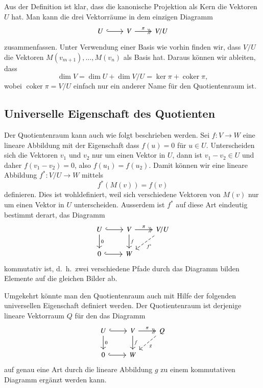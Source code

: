 Aus der Definition ist klar, dass die kanonische Projektion als
Kern die Vektoren $U$ hat.
Man kann die drei Vektorräume in dem einzigen Diagramm
\[
\begin{tikzcd}
U\ar[r,hook] & V \ar[r,two heads,"\pi"] & V/U
\end{tikzcd}
\]
zusammenfassen.
Unter Verwendung einer Basis wie vorhin finden wir, dass $V/U$ die
Vektoren $M(v_{m+1}),\dots,M(v_n)$ als Basis hat.
Daraus können wir ableiten, dass
\[
\operatorname{dim} V
=
\operatorname{dim} U
+
\operatorname{dim} V/U
=
\operatorname{ker}\pi
+
\operatorname{coker}\pi,
\]
wobei $\operatorname{coker}\pi=V/U$ einfach nur ein anderer Name für
den Quotientenraum ist.

\subsection{Universelle Eigenschaft des Quotienten}
Der Quotientenraum kann auch wie folgt beschrieben werden.
Sei $f\colon V\to W$ eine lineare Abbildung mit der Eigenschaft
dass $f(u)=0$ für $u\in U$.
Unterscheiden sich die Vektoren $v_1$ und $v_2$ nur um einen Vektor
in $U$, dann ist $v_1-v_2\in U$ und daher $f(v_1-v_2)=0$, also
$f(u_1)=f(u_2)$.
Damit können wir eine lineare Abbildung $f^*\colon V/U\to W$
mittels
\[
f^*(M(v)) = f(v)
\]
definieren.
Dies ist wohldefiniert, weil sich verschiedene Vektoren von $M(v)$ nur
um einen Vektor in $U$ unterscheiden.
Ausserdem ist
$f^*$ auf diese Art eindeutig bestimmt derart, das Diagramm
\[
\begin{tikzcd}
U \ar[r,hook] \ar[d,"0"]
		& V \ar[d, "f"] \ar[r,two heads,"\pi"]
				& V/U \ar[dl,dashed,"f^*"]
\\
0 \ar[r,hook]
		& W
\end{tikzcd}
\]
kommutativ ist, d.~h.~zwei verschiedene Pfade durch das Diagramm
bilden Elemente auf die gleichen Bilder ab.

Umgekehrt könnte man den Quotientenraum auch mit Hilfe der folgenden 
universellen Eigenschaft definiert werden.
Der Quotientenraum ist derjenige lineare Vektorraum $Q$ für den
das Diagramm
\[
\begin{tikzcd}
U \ar[r,hook] \ar[d,"0"]
		& V \ar[d, "f"] \ar[r,two heads,"\pi"]
				& Q \ar[dl,dashed,"g"]
\\
0 \ar[r,hook]
		& W
\end{tikzcd}
\]
auf genau eine Art durch die lineare Abbildung $g$ zu einem 
kommutativen Diagramm ergänzt werden kann.

